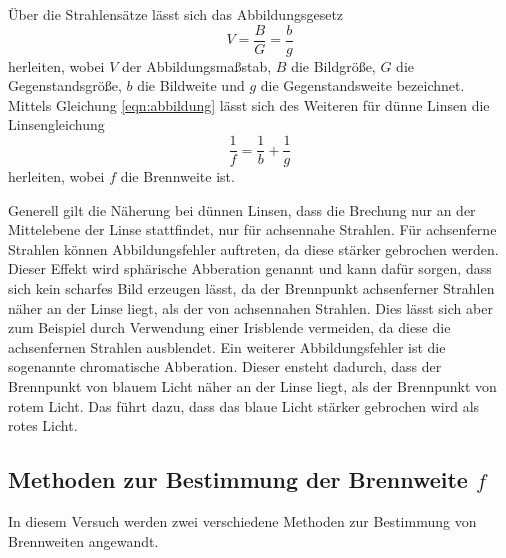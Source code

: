     Über die Strahlensätze lässt sich das Abbildungsgesetz
    \begin{equation}
    \label{eqn:abbildung}
        V = \frac{B}{G} = \frac{b}{g} 
    \end{equation}
    herleiten, wobei $V$ der Abbildungsmaßstab, $B$ die Bildgröße, $G$ die Gegenstandsgröße, $b$ die Bildweite und $g$ die Gegenstandsweite 
    bezeichnet. Mittels Gleichung \eqref{eqn:abbildung} lässt sich des Weiteren für dünne Linsen die Linsengleichung
    \begin{equation}
    \label{eqn:linsen}
        \frac{1}{f} = \frac{1}{b} + \frac{1}{g}
    \end{equation}
    herleiten, wobei $f$ die Brennweite ist. 

    Generell gilt die Näherung bei dünnen Linsen, dass die Brechung nur an der Mittelebene der Linse stattfindet, nur für achsennahe 
    Strahlen. Für achsenferne Strahlen können Abbildungsfehler auftreten, da diese stärker gebrochen werden. Dieser Effekt wird
    sphärische Abberation genannt und kann dafür sorgen, dass sich kein scharfes Bild erzeugen lässt, 
    da der Brennpunkt achsenferner Strahlen näher an der Linse liegt, als der von
    achsennahen Strahlen. Dies lässt sich aber zum Beispiel durch Verwendung einer Irisblende
    vermeiden, da diese die achsenfernen Strahlen ausblendet. Ein weiterer Abbildungsfehler ist die sogenannte chromatische Abberation.
    Dieser ensteht dadurch, dass der Brennpunkt von blauem Licht näher an der Linse liegt, als der Brennpunkt von rotem Licht. Das
    führt dazu, dass das blaue Licht stärker gebrochen wird als rotes Licht.

    \subsection{Methoden zur Bestimmung der Brennweite $f$} 
    In diesem Versuch werden zwei verschiedene Methoden zur Bestimmung von Brennweiten angewandt. 
